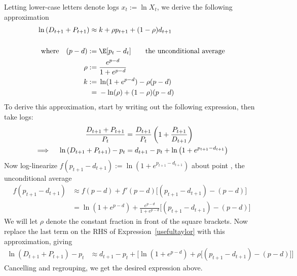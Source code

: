 \documentclass[12pt]{article}
\theoremstyle{plain}
\theoremstyle{definition}
\theoremstyle{remark}
\begin{document}
Letting lower-case letters denote logs $x_t:=\ln X_t$, we derive
the following approximation
\begin{align*}
  \ln\left(D_{t+1}+P_{t+1}\right)
  \approx&\;
  k + \rho p_{t+1} + (1-\rho)d_{t+1}
  \\
  \\
  \text{where}\quad
  (p-d):=&\;\E[p_t-d_t] \qquad\text{the unconditional average} \\
  \rho :=&\; \frac{e^{p-d}}{1+e^{p-d}} \\
  k
  :=&\; \ln(1+e^{p-d}) - \rho(p-d)
  \\
  =&\; -\ln(\rho) + (1-\rho)(p-d)
\end{align*}
To derive this approximation, start by writing out the following
expression, then take logs:
\begin{align}
  \frac{D_{t+1}+P_{t+1}}{P_t}
  &=
  \frac{D_{t+1}}{P_t}
  \left(
  1+
  \frac{P_{t+1}}{D_{t+1}}
  \right)
  \notag
  \\
  \implies\quad
  \ln\left(D_{t+1}+P_{t+1}\right)
  - p_t
  &=
  d_{t+1}-p_t
  +
  \ln
  \left(
  1+e^{p_{t+1}-d_{t+1}}
  \right)
  \label{usefultaylor}
\end{align}
Now log-linearize $f(p_{t+1}-d_{t+1}):=\ln(1+e^{p_{t+1}-d_{t+1}})$
about point , the unconditional average
\begin{align*}
  f(p_{t+1}-d_{t+1})
  &\approx
  f(p-d) + f'(p-d)\big[(p_{t+1}-d_{t+1})-(p-d)\big]
  \\
  &=
  \ln(1+e^{p-d})
  +
  \frac{e^{p-d}}{1+e^{p-d}}
  \big[(p_{t+1}-d_{t+1})-(p-d)\big]
\end{align*}
We will let $\rho$ denote the constant fraction in front of the square
brackets.
Now replace the last term on the RHS of Expression~\ref{usefultaylor}
with this approximation, giving
\begin{align*}
  \ln\left(D_{t+1}+P_{t+1}\right)
  - p_t
  &\approx
  d_{t+1}-p_t
  +
  \big[
  \ln(1+e^{p-d})
  +
  \rho
  \big[(p_{t+1}-d_{t+1})-(p-d)\big]
  \big]
\end{align*}
Cancelling and regrouping, we get the desired expression above.


\end{document}

